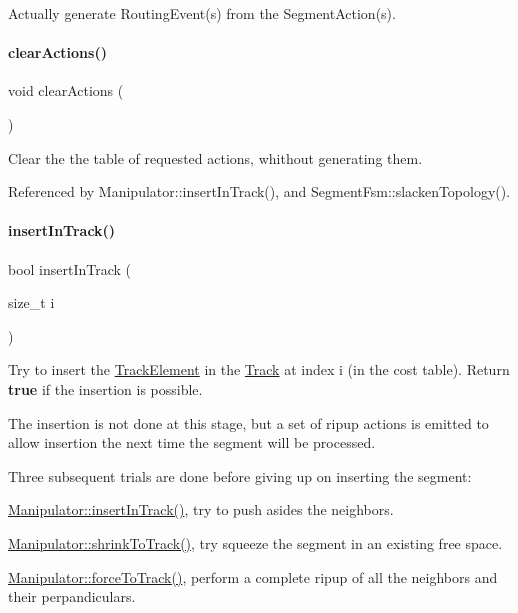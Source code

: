 Actually generate Routing\+Event(s) from the Segment\+Action(s). \mbox{\label{classKite_1_1SegmentFsm_a4cf911f1f4e5ac588d502c9d069a1bde}} 
\paragraph{\texorpdfstring{clear\+Actions()}{clearActions()}}
{\footnotesize\ttfamily void clear\+Actions (\begin{DoxyParamCaption}{ }\end{DoxyParamCaption})\hspace{0.3cm}{\ttfamily [inline]}}

Clear the the table of requested actions, whithout generating them. 

Referenced by Manipulator\+::insert\+In\+Track(), and Segment\+Fsm\+::slacken\+Topology().

\mbox{\label{classKite_1_1SegmentFsm_a7140b507da2cab137d968a037bed19df}} 
\paragraph{\texorpdfstring{insert\+In\+Track()}{insertInTrack()}}
{\footnotesize\ttfamily bool insert\+In\+Track (\begin{DoxyParamCaption}\item[{size\+\_\+t}]{i }\end{DoxyParamCaption})}

Try to insert the \mbox{\hyperlink{classKite_1_1TrackElement}{Track\+Element}} in the \mbox{\hyperlink{classKite_1_1Track}{Track}} at index {\ttfamily i} (in the cost table). Return {\bfseries true} if the insertion is possible.

The insertion is not done at this stage, but a set of ripup actions is emitted to allow insertion the next time the segment will be processed.

Three subsequent trials are done before giving up on inserting the segment\+:
\begin{DoxyEnumerate}
\item \mbox{\hyperlink{classKite_1_1Manipulator_a7140b507da2cab137d968a037bed19df}{Manipulator\+::insert\+In\+Track()}}, try to push asides the neighbors.
\item \mbox{\hyperlink{classKite_1_1Manipulator_aba69c61ccb330e26aaa8211f0454795f}{Manipulator\+::shrink\+To\+Track()}}, try squeeze the segment in an existing free space.
\item \mbox{\hyperlink{classKite_1_1Manipulator_a76d3956660cfa624696e2a5f2916cd22}{Manipulator\+::force\+To\+Track()}}, perform a complete ripup of all the neighbors and their perpandiculars.
\end{DoxyEnumerate}

